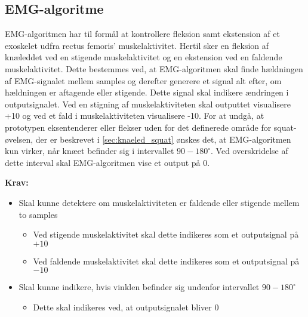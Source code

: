 \subsection{EMG-algoritme}\label{sec:krav_emg_algo}
EMG-algoritmen har til formål at kontrollere fleksion samt ekstension af et exoskelet udfra rectus femoris' muskelaktivitet. 
Hertil sker en fleksion af knæleddet ved en stigende muskelaktivitet og en ekstension ved en faldende muskelaktivitet.
Dette bestemmes ved, at EMG-algoritmen skal finde hældningen af EMG-signalet mellem samples og derefter generere et signal alt efter, om hældningen er aftagende eller stigende. 
Dette signal skal indikere ændringen i outputsignalet. 
Ved en stigning af muskelaktiviteten skal outputtet visualisere +10 og ved et fald i muskelaktiviteten visualisere -10.
For at undgå, at prototypen eksentenderer eller flekser uden for det definerede område for squat-øvelsen, der er beskrevet i \autoref{sec:knaeled_squat} ønskes det, at EMG-algoritmen kun virker, når knæet befinder sig i intervallet $90-180^{\circ}$. 
Ved overskridelse af dette interval skal EMG-algoritmen vise et output på 0.


\vspace{3mm}
\textbf{Krav:}
\begin{itemize}
\item Skal kunne detektere om muskelaktiviteten er faldende eller stigende mellem to samples
\begin{itemize}
\item Ved stigende muskelaktivitet skal dette indikeres som et outputsignal på $+10$
\item Ved faldende muskelaktivitet skal dette indikeres som et outputsignal på $-10$
\end{itemize}
\item Skal kunne indikere, hvis vinklen befinder sig undenfor intervallet $90-180^{\circ}$
\begin{itemize}
\item Dette skal indikeres ved, at outputsignalet bliver $0$
\end{itemize}
\end{itemize}


